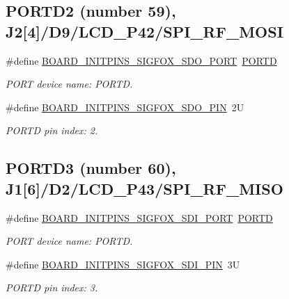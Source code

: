 \subsection*{P\+O\+R\+T\+D2 (number 59), J2\mbox{[}4\mbox{]}/\+D9/\+L\+C\+D\+\_\+\+P42/\+S\+P\+I\+\_\+\+R\+F\+\_\+\+M\+O\+SI}
\begin{DoxyCompactItemize}
\item 
\mbox{\label{group__pin__mux_gad75c2dd5e1115086f72dd30a921f431a}} 
\#define \mbox{\hyperlink{group__pin__mux_gad75c2dd5e1115086f72dd30a921f431a}{B\+O\+A\+R\+D\+\_\+\+I\+N\+I\+T\+P\+I\+N\+S\+\_\+\+S\+I\+G\+F\+O\+X\+\_\+\+S\+D\+O\+\_\+\+P\+O\+RT}}~\mbox{\hyperlink{group___p_o_r_t___peripheral___access___layer_ga3e6a2517db4f9cb7c9037adf0aefe79b}{P\+O\+R\+TD}}
\begin{DoxyCompactList}\small\item\em P\+O\+RT device name\+: P\+O\+R\+TD. \end{DoxyCompactList}\item 
\mbox{\label{group__pin__mux_ga7ec843cc4986266c9777779fdb00085f}} 
\#define \mbox{\hyperlink{group__pin__mux_ga7ec843cc4986266c9777779fdb00085f}{B\+O\+A\+R\+D\+\_\+\+I\+N\+I\+T\+P\+I\+N\+S\+\_\+\+S\+I\+G\+F\+O\+X\+\_\+\+S\+D\+O\+\_\+\+P\+IN}}~2U
\begin{DoxyCompactList}\small\item\em P\+O\+R\+TD pin index\+: 2. \end{DoxyCompactList}\end{DoxyCompactItemize}
\subsection*{P\+O\+R\+T\+D3 (number 60), J1\mbox{[}6\mbox{]}/\+D2/\+L\+C\+D\+\_\+\+P43/\+S\+P\+I\+\_\+\+R\+F\+\_\+\+M\+I\+SO}
\begin{DoxyCompactItemize}
\item 
\mbox{\label{group__pin__mux_ga0c6d883e1dbdbccad90025466ac61773}} 
\#define \mbox{\hyperlink{group__pin__mux_ga0c6d883e1dbdbccad90025466ac61773}{B\+O\+A\+R\+D\+\_\+\+I\+N\+I\+T\+P\+I\+N\+S\+\_\+\+S\+I\+G\+F\+O\+X\+\_\+\+S\+D\+I\+\_\+\+P\+O\+RT}}~\mbox{\hyperlink{group___p_o_r_t___peripheral___access___layer_ga3e6a2517db4f9cb7c9037adf0aefe79b}{P\+O\+R\+TD}}
\begin{DoxyCompactList}\small\item\em P\+O\+RT device name\+: P\+O\+R\+TD. \end{DoxyCompactList}\item 
\mbox{\label{group__pin__mux_gac4f22e017be22220b3567221460f0f40}} 
\#define \mbox{\hyperlink{group__pin__mux_gac4f22e017be22220b3567221460f0f40}{B\+O\+A\+R\+D\+\_\+\+I\+N\+I\+T\+P\+I\+N\+S\+\_\+\+S\+I\+G\+F\+O\+X\+\_\+\+S\+D\+I\+\_\+\+P\+IN}}~3U
\begin{DoxyCompactList}\small\item\em P\+O\+R\+TD pin index\+: 3. \end{DoxyCompactList}\end{DoxyCompactItemize}
